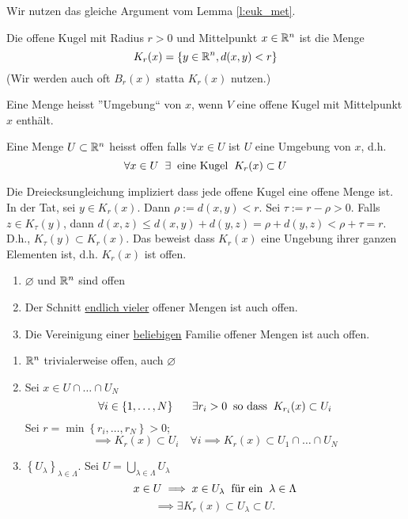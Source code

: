\begin{Bew} Wir nutzen das gleiche Argument vom Lemma \ref{l:euk_met}.
\end{Bew}
\begin{Def}
  Die offene Kugel mit Radius $r>0$ und Mittelpunkt $x\in\mathbb{R}^n$ ist die Menge
  \[K_r(x)=\left\{ y\in\mathbb{R}^n, d(x,y)<r \right\}\]
(Wir werden auch oft $B_r (x)$ statta $K_r (x)$ nutzen.)
\end{Def}
\begin{Def}
  Eine Menge heisst ''Umgebung`` von $x$, wenn $V$ eine offene Kugel mit Mittelpunkt $x$ enth\"alt.
\end{Def}
\begin{Def}
  Eine Menge $U\subset\mathbb{R}^n$ heisst offen falls $\forall x\in U$ ist $U$ eine Umgebung von $x$, d.h.
  \[\forall x\in U\hspace{2mm}\exists \hspace{2mm}\text{eine Kugel}\hspace{2mm} K_r(x)\subset U\]
\end{Def}
\begin{Bem}
Die Dreiecksungleichung impliziert dass jede offene Kugel eine offene Menge ist. In der Tat,
sei $y\in K_r (x)$. Dann $\rho:=d(x,y) < r$. Sei $\tau:= r-\rho>0$. Falls $z\in K_\tau (y)$,
dann $d(x,z)\leq d(x,y) + d(y,z) = \rho + d (y,z) < \rho +\tau =r$. D.h., $K_\tau (y)\subset K_r (x)$.
Das beweist dass $K_r (x)$ eine Ungebung ihrer ganzen Elementen ist, d.h. $K_r (x)$ ist offen. 
\end{Bem}
\begin{Sat}
  \begin{enumerate}
    \item $\varnothing$ und $\mathbb{R}^n$ sind offen
    \item Der Schnitt \ul{endlich vieler} offener Mengen ist auch offen.
    \item Die Vereinigung einer \ul{beliebigen} Familie offener Mengen ist auch offen.
  \end{enumerate}
\end{Sat}
\begin{Bew}
  \begin{enumerate}
    \item $\mathbb{R}^n$ trivialerweise offen, auch $\varnothing$
    \item Sei $x\in U\cap\dots\cap U_N$
      \[\forall i\in\left\{ 1,\dots,N \right\}\hspace{2mm} \quad \exists r_i>0 \;\;\mbox{so dass}\;\; K_{r_i}(x)\subset U_i\]
      Sei $r=\min\left\{ r_i,\dots,r_N \right\} > 0$;
      \[\implies K_r(x)\subset U_i\quad\forall i\implies K_r(x)\subset U_1\cap\dots\cap U_N\]
    \item $\left\{ U_\lambda \right\}_{\lambda\in \Lambda}$. Sei $U=\bigcup_{\lambda\in\Lambda}U_\lambda$
      \[x\in U\implies x\in U_\lambda\hspace{2mm}\text{f\"ur ein}\hspace{2mm}\lambda\in\Lambda\]
      \[\implies \exists K_r(x)\subset U_\lambda\subset U.\]
  \end{enumerate}
\end{Bew}
